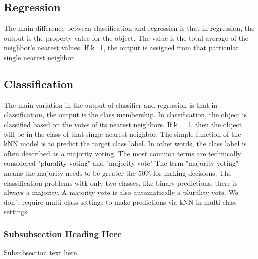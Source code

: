 \documentclass[conference]{IEEEtran}
\begin{document}
\subsection{Regression}
The main difference between classification and regression is that in regression, the output is the property value for the object. The value is the total average of the neighbor's nearest values. If k=1, the output is assigned from that particular single nearest neighbor. 

\subsection{Classification}
The main variation in the output of classifier and regression is that in classification, the output is the class membership. In classification, the object is classified based on the votes of its nearest neighbors. If k = 1, then the object will be in the class of that single nearest neighbor. The simple function of the kNN model is to predict the target class label. In other words, the class label is often described as a majority voting. The most common terms are technically considered "plurality voting" and "majority vote" The term "majority voting" means the majority needs to be greater the 50\%  
for making decisions. The classification problems with only two classes, like binary predictions, there is always a majority. A majority vote is also automatically a plurality vote. We don't require multi-class settings to make predictions via kNN in multi-class settings. 




\subsubsection{Subsubsection Heading Here}
Subsubsection text here.


%
%
\end{document}
